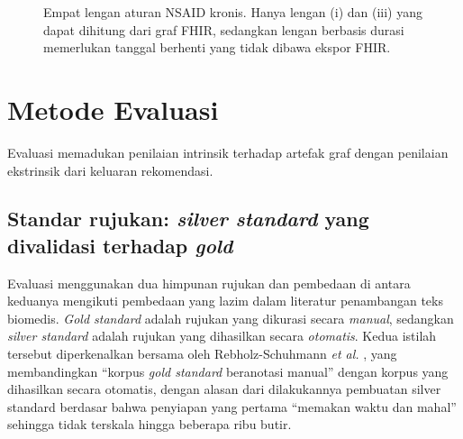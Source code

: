 \begin{figure}[htbp]
\centering
{}
\caption{Empat lengan aturan NSAID kronis. Hanya lengan (i) dan (iii) yang dapat dihitung dari
graf FHIR, sedangkan lengan berbasis durasi memerlukan tanggal berhenti yang tidak dibawa ekspor FHIR.}
\label{fig:chronicity}
\end{figure}

\section{Metode Evaluasi}
\label{sec:eval-method}

Evaluasi memadukan penilaian intrinsik terhadap artefak graf dengan penilaian ekstrinsik dari
keluaran rekomendasi.

\subsection{Standar rujukan: \emph{silver standard} yang divalidasi terhadap \emph{gold}}
\label{sec:oracle}

Evaluasi menggunakan dua himpunan rujukan dan pembedaan di antara keduanya mengikuti
pembedaan yang lazim dalam literatur penambangan teks biomedis. \emph{Gold standard} adalah
rujukan yang dikurasi secara \emph{manual}, sedangkan \emph{silver standard} adalah rujukan yang
dihasilkan secara \emph{otomatis}. Kedua istilah tersebut diperkenalkan bersama oleh
Rebholz-Schuhmann \textit{et al.} \cite{rebholz2010,rebholz2011}, yang membandingkan
``korpus \emph{gold standard} beranotasi manual'' dengan korpus yang dihasilkan secara
otomatis, dengan alasan dari dilakukannya pembuatan silver standard berdasar bahwa penyiapan yang pertama
``memakan waktu dan mahal'' sehingga tidak terskala hingga beberapa ribu butir.

